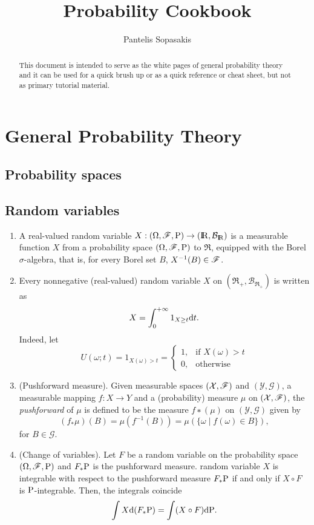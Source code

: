 \documentclass[a4paper,10pt]{article}
\title{Probability Cookbook}
\author{Pantelis Sopasakis}
\begin{document}
\maketitle

\begin{abstract}
 This document is intended to serve as the white pages of general probability
 theory and it can be used for a quick brush up or as a quick reference or 
 cheat sheet, but not as primary tutorial material.
\end{abstract}

\section{General Probability Theory}

\subsection{Probability spaces}

\subsection{Random variables}
\begin{enumerate}
 \item 
 \label{rv220000}
       A real-valued random variable $X:\ofp \to (\Re, \mathcal{B}_\Re)$ is a measurable function $X$
       from a probability space $(\Omega,\mathscr{F},\mathrm{P})$ to $\Re$, equipped with the Borel $\sigma$-algebra, that is, 
       for every Borel set $B$, $X^{-1}(B)\in\mathscr{F}$.
       
 \item 
 \label{rv221030}
 Every nonnegative (real-valued) random variable $X$ on $(\Re_+, \mathcal{B}_{{\Re}_+})$ 
 is written as 
 \[
  X = \int_0^{+\infty} 1_{X\geq t}\mathrm{d} t.
 \]
 Indeed, let 
 \[
    U(\omega;t) = 1_{X(\omega)>t} = \begin{cases}
                                     1,&\text{if } X(\omega)>t\\
                                     0,&\text{otherwise}
                                    \end{cases}
 \]
 \item (Pushforward measure). Given measurable spaces $(\mathcal{X},\mathscr{F})$ and $(\mathcal{Y}, \mathcal{G})$, 
 a measurable mapping $f: X \to Y$ and a (probability) measure $\mu$ on $(\mathcal{X},\mathscr{F})$, the \textit{pushforward} of $\mu$
 is defined to be the measure $f∗(μ)$ on $(\mathcal{Y}, \mathcal{G})$ given by
 \[
  (f_*\mu)(B) = \mu(f^{-1}(B)) = \mu(\{\omega\mid f(\omega)\in B\}),
 \]
 for $B\in\mathcal{G}$.
 \item (Change of variables). Let $F$ be a random variable on the probability space $(\Omega,\mathscr{F},\mathrm{P})$ and $F_*\mathrm{P}$ 
 is the pushforward measure. random variable $X$ is integrable with respect to the pushforward measure $F_*\mathrm{P}$
 if and only if $X\circ F$ is $\mathrm{P}$-integrable. Then, the integrals coincide
 \[
  \int X \mathrm{d}(F_*\mathrm{P}) = \int (X\circ F) \mathrm{d} \mathrm{P}.
 \]

\end{enumerate}
\end{document}

